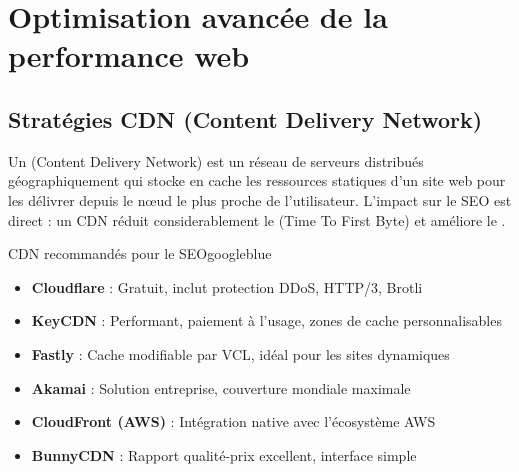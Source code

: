 %


\chapter{Optimisation avancée de la performance web}
\label{ch:perfweb}

\section{Stratégies CDN (Content Delivery Network)}

Un  (Content Delivery Network) est un réseau de serveurs distribués géographiquement qui stocke en cache les ressources statiques d'un site web pour les délivrer depuis le nœud le plus proche de l'utilisateur. L'impact sur le SEO est direct : un CDN réduit considerablement le  (Time To First Byte) et améliore le .

\begin{mybox}{CDN recommandés pour le SEO}{googleblue}
\begin{itemize}
    \item \textbf{Cloudflare} : Gratuit, inclut protection DDoS, HTTP/3, Brotli
    \item \textbf{KeyCDN} : Performant, paiement à l'usage, zones de cache personnalisables
    \item \textbf{Fastly} : Cache modifiable par VCL, idéal pour les sites dynamiques
    \item \textbf{Akamai} : Solution entreprise, couverture mondiale maximale
    \item \textbf{CloudFront (AWS)} : Intégration native avec l'écosystème AWS
    \item \textbf{BunnyCDN} : Rapport qualité-prix excellent, interface simple
\end{itemize}
\end{mybox}

